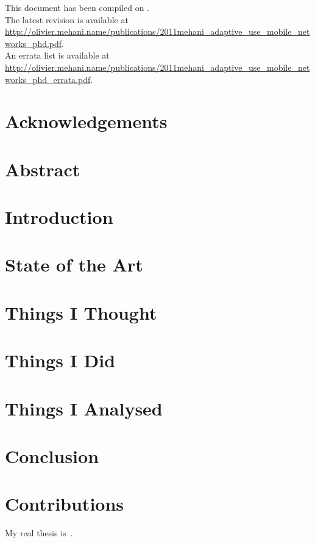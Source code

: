 \documentclass[11pt,a4paper,openright]{memoir}
\title{\theTitle}
\author{\theAuthor}
\begin{document}
\frontmatter

\makeunswfrontmatter

\newpage
\thispagestyle{empty}
\strut
\vfill
\begin{flushleft}
  This document has been compiled on \usebox{\compiledate}.\\
  The latest revision is available at
  \url{http://olivier.mehani.name/publications/2011mehani_adaptive_use_mobile_networks_phd.pdf}.\\
  An errata list is available at
  \url{http://olivier.mehani.name/publications/2011mehani_adaptive_use_mobile_networks_phd_errata.pdf}.
\end{flushleft}

\chapter*{Acknowledgements}

\chapter*{Abstract}

\cleardoublepage
\tableofcontents

\mainmatter

\chapter{Introduction}

\chapter{State of the Art}

\chapter{Things I Thought}

\chapter{Things I Did}

\chapter{Things I Analysed}

\chapter{Conclusion}

\backmatter

\printbibliography

\appendix

\chapter{Contributions}

My real thesis is~\cite{2011mehani_adaptive_use_mobile_networks_phd}.
\end{document}
